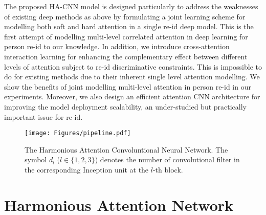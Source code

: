 \documentclass[10pt,twocolumn,letterpaper]{article}
\begin{document}
The proposed HA-CNN model is designed particularly to
address the weaknesses of existing deep methods as above
by formulating a joint learning scheme for modelling both soft and hard attention
in a single re-id deep model.
This is the first attempt of modelling multi-level correlated attention in deep learning
for person re-id to our knowledge.
In addition, we introduce cross-attention interaction learning for enhancing the complementary
effect between different levels of attention subject to re-id
discriminative constraints. This is impossible to do for existing
methods due to their inherent single level attention modelling. We
show the benefits of joint modelling multi-level attention in person
re-id in our experiments. Moreover, we also design an efficient attention CNN architecture for 
improving the model deployment scalability,
an under-studied but practically important issue for re-id.





\begin{figure*} [h]\centering
\texttt{[image: Figures/pipeline.pdf]}
\caption{ The Harmonious Attention Convoluntional Neural Network.
	The symbol $d_l$ ($l\in\{1,2,3\}$) denotes the number of convolutional filter in the corresponding Inception unit at the $l$-th block.
	}
	\label{fig:pipline}
	\vspace{-0.5cm}
\end{figure*}



\section{Harmonious Attention Network}
\end{document}
